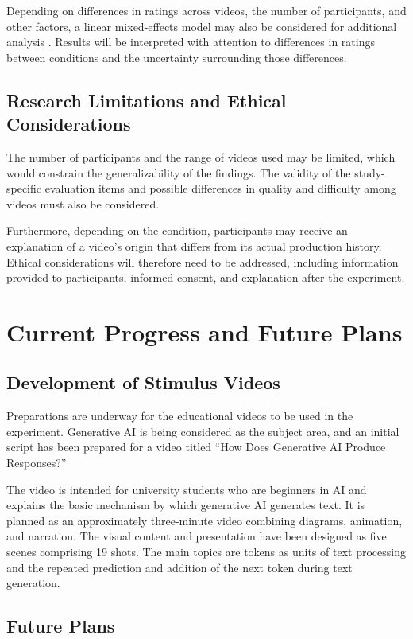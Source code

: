 \documentclass[11pt]{ltjarticle}
\begin{document}
Depending on differences in ratings across videos, the number of participants, and other factors, a linear mixed-effects model may also be considered for additional analysis \cite{baayen2008}. Results will be interpreted with attention to differences in ratings between conditions and the uncertainty surrounding those differences.

\subsection{Research Limitations and Ethical Considerations}

The number of participants and the range of videos used may be limited, which would constrain the generalizability of the findings. The validity of the study-specific evaluation items and possible differences in quality and difficulty among videos must also be considered.

Furthermore, depending on the condition, participants may receive an explanation of a video's origin that differs from its actual production history. Ethical considerations will therefore need to be addressed, including information provided to participants, informed consent, and explanation after the experiment.

\section{Current Progress and Future Plans}

\subsection{Development of Stimulus Videos}

Preparations are underway for the educational videos to be used in the experiment. Generative AI is being considered as the subject area, and an initial script has been prepared for a video titled ``How Does Generative AI Produce Responses?''

The video is intended for university students who are beginners in AI and explains the basic mechanism by which generative AI generates text. It is planned as an approximately three-minute video combining diagrams, animation, and narration. The visual content and presentation have been designed as five scenes comprising 19 shots. The main topics are tokens as units of text processing and the repeated prediction and addition of the next token during text generation.

\subsection{Future Plans}
\end{document}
